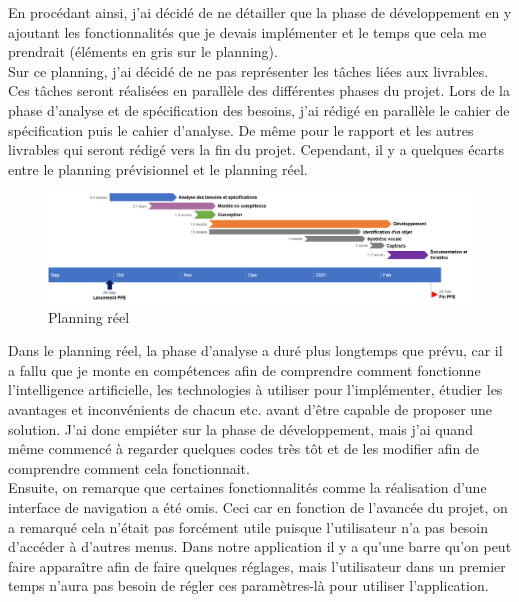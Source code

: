 \documentclass[UTF8]{EPURapport}
\begin{document}
En procédant ainsi, j'ai décidé de ne détailler que la phase de développement en y ajoutant les fonctionnalités que je devais implémenter et le temps que cela me prendrait (éléments en gris sur le planning).\\

Sur ce planning, j'ai décidé de ne pas représenter les tâches liées aux livrables. Ces tâches seront réalisées en parallèle des différentes phases du projet. Lors de la phase d'analyse et de spécification des besoins, j'ai rédigé en parallèle le cahier de spécification puis le cahier d'analyse. De même pour le rapport et les autres livrables qui seront rédigé vers la fin du projet. Cependant, il y a quelques écarts entre le planning prévisionnel et le planning réel. \\

\begin{figure}[h!]
\centering
  \includegraphics[width=\textwidth]{images/PlanningReel.png}
  \caption{Planning réel}
  \label{fig:planningreel}
\end{figure}

Dans le planning réel, la phase d'analyse a duré plus longtemps que prévu, car il a fallu que je monte en compétences afin de comprendre comment fonctionne l'intelligence artificielle, les technologies à utiliser pour l'implémenter, étudier les avantages et inconvénients de chacun etc. avant d'être capable de proposer une solution. J'ai donc empiéter sur la phase de développement, mais j'ai quand même commencé à regarder quelques codes très tôt et de les modifier afin de comprendre comment cela fonctionnait. \\

Ensuite, on remarque que certaines fonctionnalités comme la réalisation d'une interface de navigation a été omis. Ceci car en fonction de l'avancée du projet, on a remarqué cela n'était pas forcément utile puisque l'utilisateur n'a pas besoin d'accéder à d'autres menus. Dans notre application il y a qu'une barre qu'on peut faire apparaître afin de faire quelques réglages, mais l'utilisateur dans un premier temps n'aura pas besoin de régler ces paramètres-là pour utiliser l'application. \\
\end{document}
